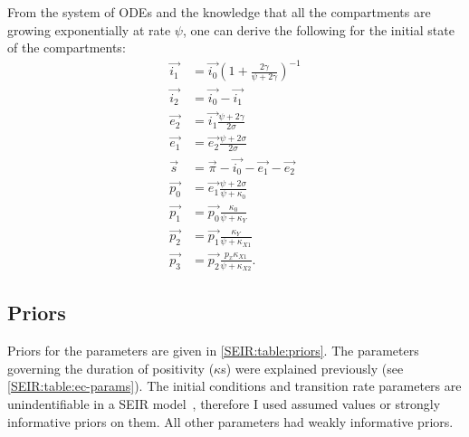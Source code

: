 \documentclass[thesis.tex]{subfiles}
\begin{document}
From the system of ODEs and the knowledge that all the compartments are growing exponentially at rate $\psi$, one can derive the following for the initial state of the compartments:
\begin{align}
    \vec{i_1} &= \vec{i_0} \left(1 + \frac{2\gamma}{\psi + 2\gamma} \right)^{-1} \\
    \vec{i_2} &= \vec{i_0} - \vec{i_1} \\
    \vec{e_2} &= \vec{i_1} \frac{\psi + 2\gamma}{2\sigma} \\
    \vec{e_1} &= \vec{e_2} \frac{\psi + 2\sigma}{2\sigma} \\
    \vec{s} &= \vec{\pi} - \vec{i_0} - \vec{e_1} - \vec{e_2} \\
    \vec{p_0} &= \vec{e_1} \frac{\psi + 2\sigma}{\psi + \kappa_0} \\
    \vec{p_1} &= \vec{p_0} \frac{\kappa_0}{\psi + \kappa_Y} \\
    \vec{p_2} &= \vec{p_1} \frac{\kappa_Y}{\psi + \kappa_{X1}} \\
    \vec{p_3} &= \vec{p_2} \frac{p_x \kappa_{X1}}{\psi + \kappa_{X2}}.
\end{align}

\subsection{Priors} \label{SEIR:sec:priors}
Priors for the parameters are given in \cref{SEIR:table:priors}.
The parameters governing the duration of positivity ($\kappa$s) were explained previously (see \cref{SEIR:table:ec-params}).
The initial conditions and transition rate parameters are unindentifiable in a SEIR model~\autocite{dankwaStructural}, therefore I used assumed values or strongly informative priors on them.
All other parameters had weakly informative priors.
\end{document}
